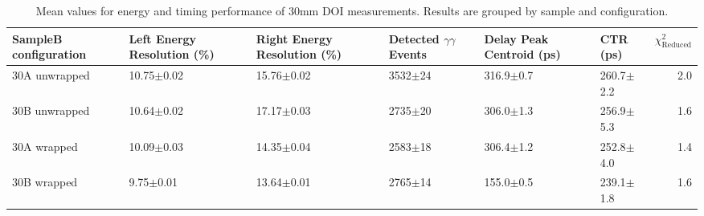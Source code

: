 \begin{table}
\caption{\label{tab:doictrresults} Mean values for energy and timing performance of 30mm DOI measurements. Results are grouped by sample and configuration.}
\begin{tabular}{llllllr}
\hline
SampleB configuration & Left Energy Resolution (\%) & Right Energy Resolution (\%) & Detected $\gamma\gamma$ Events & Delay Peak Centroid (ps)  & CTR (ps) &  $\chi^2_\text{Reduced}$ \\
\hline
30A     unwrapped     &  10.75$\pm$0.02 &  15.76$\pm$0.02 &  3532$\pm$24 &  316.9$\pm$0.7 &  260.7$\pm$2.2 &        2.0 \\
30B     unwrapped     &  10.64$\pm$0.02 &  17.17$\pm$0.03 &  2735$\pm$20 &  306.0$\pm$1.3 &  256.9$\pm$5.3 &        1.6 \\
30A     wrapped       &  10.09$\pm$0.03 &  14.35$\pm$0.04 &  2583$\pm$18 &  306.4$\pm$1.2 &  252.8$\pm$4.0 &        1.4 \\
30B     wrapped       &   9.75$\pm$0.01 &  13.64$\pm$0.01 &  2765$\pm$14 &  155.0$\pm$0.5 &  239.1$\pm$1.8 &        1.6 \\
\hline
\end{tabular}
\end{table}

